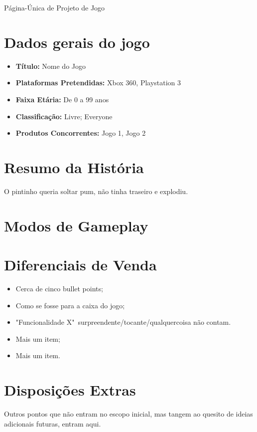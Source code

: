 \documentclass[10pt,a4paper,oneside]{article}
\begin{document}
{\center \huge Página-Única de Projeto de Jogo}

\begin{versionhistory}
\end{versionhistory}

\section{Dados gerais do jogo}
\begin{itemize}
    \item \textbf{Título:} Nome do Jogo
    \item \textbf{Plataformas Pretendidas:} Xbox 360, Playstation 3
    \item \textbf{Faixa Etária:} De 0 a 99 anos
    \item \textbf{Classificação:} Livre; Everyone
    \item \textbf{Produtos Concorrentes:} Jogo 1, Jogo 2
\end{itemize}

\section{Resumo da História}
O pintinho queria soltar pum, não tinha traseiro e explodiu.

\section{Modos de Gameplay}

\section{Diferenciais de Venda}
\begin{itemize}
    \item Cerca de cinco bullet points;
    \item Como se fosse para a caixa do jogo;
    \item "Funcionalidade X"\ surpreendente/tocante/qualquercoisa não contam.
    \item Mais um item;
    \item Mais um item.
\end{itemize}

\section{Disposições Extras}
Outros pontos que não entram no escopo inicial, mas tangem ao quesito de ideias
adicionais futuras, entram aqui.
\end{document}
